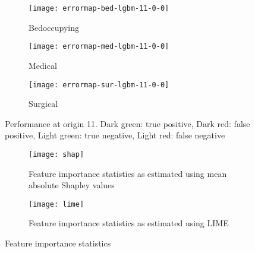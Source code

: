 \begin{sidewaystable}

\end{sidewaystable}


\begin{figure}[H]
    \centering
        \begin{subfigure}[b]{1.0\textwidth}
            \texttt{[image: errormap-bed-lgbm-11-0-0]}
            \caption{Bedoccupying}
        \end{subfigure}
        \begin{subfigure}[b]{1.0\textwidth}
            \texttt{[image: errormap-med-lgbm-11-0-0]}
            \caption{Medical}
        \end{subfigure}
        \begin{subfigure}[b]{1.0\textwidth}
            \texttt{[image: errormap-sur-lgbm-11-0-0]}
            \caption{Surgical}
        \end{subfigure}
        \caption{Performance at origin 11. Dark green: true positive, Dark red: false positive, Light green: true negative, Light red: false negative}
        \label{fig:errormap}
\end{figure}





\begin{figure}[H]
    \centering
    \begin{subfigure}[b]{1.0\textwidth}
        \texttt{[image: shap]}
        \caption{Feature importance statistics as estimated using mean absolute Shapley values}
        \label{fig:shap}
    \end{subfigure}
    \begin{subfigure}[b]{1.0\textwidth}
        \texttt{[image: lime]}
        \caption{Feature importance statistics as estimated using LIME}
        \label{fig:lime}
    \end{subfigure}
    \caption{Feature importance statistics}
    \label{fig:importance}
\end{figure}